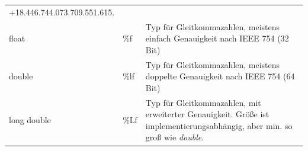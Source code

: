 \documentclass[a4paper,10pt]{article}
\begin{document}
\begin{center}
\begin{tabularx}{\textwidth}{|L{3.5cm}|L{1.3cm}|X|}
                               +18.446.744.073.709.551.615.\\
            float               &\%f       & Typ für Gleitkommazahlen, meistens einfach Genauigkeit
                                                                nach IEEE 754 (32 Bit)\\ 
            double              &\%lf       & Typ für Gleitkommazahlen, meistens doppelte Genauigkeit
                                                                nach IEEE 754 (64 Bit)\\
            long double         &\%Lf       & Typ für Gleitkommazahlen, mit erweiterter Genauigkeit. Größe ist       
                                            implementierungsabhängig, aber min. so groß wie \textit{double}.\\
        \hline
    \end{tabularx}
\end{center}
\end{document}
